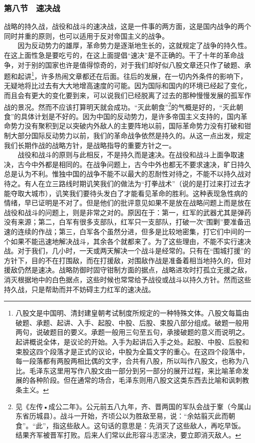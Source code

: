 \documentclass[cn,11pt,chinese]{elegantbook}
\def\myformat#1{\hfil\hfil #1}
\begin{document}
\subsubsection*{\myformat{第八节　速决战}}
战略的持久战，战役和战斗的速决战，这是一件事的两方面，这是国内战争的两个同时并重的原则，也可以适用于反对帝国主义的战争。\\
　　因为反动势力的雄厚，革命势力是逐渐地生长的，这就规定了战争的持久性。在这上面性急是要吃亏的，在这上面提倡“速决”是不正确的。干了十年的革命战争，对于别的国家也许是值得惊奇的，对于我们却好似八股文章还只作了破题、承题和起讲\footnote[52]{ 八股文是中国明、清封建皇朝考试制度所规定的一种特殊文体。八股文每篇由破题、承题、起讲、入手、起股、中股、后股、束股八部分组成。破题一般用两句，说破题目的要义。承题一般用三句至五句，承接破题的意义而说明之。起讲概说全体，是议论的开始。入手为起讲后入手之处。起股、中股、后股和束股这四个段落才是正式的议论，中股为全篇文字的重心。在这四个段落中，每一段落都有两股两相比偶的文字，合共有八股，所以叫作八股文，也称为八比。毛泽东这里用写作八股文由一部分到另一部分的展开过程，来比喻革命发展的各种阶段。但在通常的场合，毛泽东则用八股文这类东西去比喻和讽刺教条主义。}，许多热闹文章都还在后面。往后的发展，在一切内外条件的影响下，无疑地将比过去有大大地增高速度的可能。因为国际和国内的环境已经起了变化，而且会有更大的变化要到来，可以说我们已经脱离了过去的那种慢慢发展的孤军作战的景况。然而不应该打算明天就会成功。“灭此朝食”\footnote[53]{ 见《左传•成公二年》。公元前五八九年，齐、晋两国的军队会战于鞌（今属山东省历城县）。战斗一开始，齐顷公以为胜敌至易，说：“余姑翦灭此而朝食”。“此”，指这些敌人。这句话的意思是：先消灭了这些敌人，再吃早饭。结果齐军被晋军打败。后来人们常以此形容斗志坚决，要立即消灭敌人。}的气概是好的，“灭此朝食”的具体计划是不好的。因为中国的反动势力，是许多帝国主义支持的，国内革命势力没有聚积到足以突破内外敌人的主要阵地以前，国际革命势力没有打破和钳制大部分国际反动势力以前，我们的革命战争依然是持久的。从这一点出发，规定我们长期作战的战略方针，是战略指导的重要方针之一。\\
　　战役和战斗的原则与此相反，不是持久而是速决。在战役和战斗上面争取速决，古今中外都是相同的。在战争问题上，古今中外也都无不要求速决，旷日持久总是认为不利。惟独中国的战争不能不以最大的忍耐性对待之，不能不以持久战对待之。有人在立三路线时期讥笑我们的做法为“打拳战术”（说的是打过来打过去才能夺取大城市），讥笑我们要待头发白了才能看见革命的胜利。这种表现急性病的情绪，早已证明是不对了。但是他们的批评意见如果不是放在战略问题上而是放在战役和战斗的问题上，则是非常之对的。原因在于：第一，红军的武器尤其是弹药没有来源；第二，白军有很多支部队，红军只一支部队，打破一次“围剿”要准备迅速的连续的作战；第三，白军各个虽然分进，但多是比较地密集，打它们中间的一个如果不能迅速地解决战斗，其余各个就都来了。为了这些理由，不能不实行速决战。对于我们，几小时，一天或两天解决一个战斗是经常的。只有在“围城打援”的方针下，目的不在打围敌，而在打援敌，对围敌作战是准备着相当地持久的，但对援敌仍然是速决。战略防御时固守钳制方面的据点，战略进攻时打孤立无援之敌，消灭根据地中的白色据点，这些时候也常常给予战役或战斗以持久方针。然而这些持久战，只是帮助而并不妨碍主力红军的速决战。\\
\end{document}
